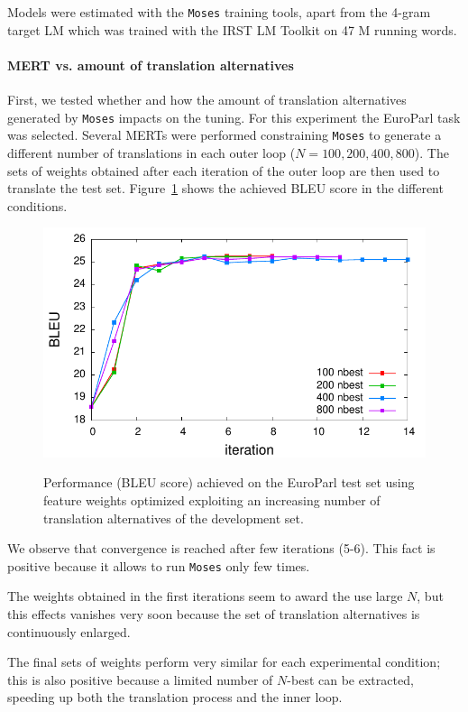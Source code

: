\documentclass[11pt]{report}
\theoremstyle{plain}
\begin{document}
{Models were estimated with the {\tt Moses} training tools, apart from the 4-gram target LM which was trained with the IRST LM Toolkit on 47 M running words.


\paragraph{MERT vs. amount of translation alternatives}
First, we tested whether and how the amount of translation alternatives generated by {\tt Moses} impacts on the tuning. For this experiment the EuroParl task was selected. Several MERTs were performed constraining {\tt Moses} to generate a different number of translations in each outer loop ($N=100, 200, 400, 800$). The sets of weights obtained after each iteration of the outer loop are then used to translate the test set. Figure~\ref{fig:MERT-epps-nbest} shows the achieved BLEU score in the different conditions.

\begin{figure}[ht]
\begin{center}
\label{fig:MERT-epps-nbest}
 \includegraphics[width=0.75\columnwidth]{MERT-nbest}
\caption{Performance (BLEU score) achieved on the EuroParl test set using feature weights optimized exploiting an increasing number of translation alternatives of the development set.}
\end{center}
 \end{figure}

We observe that convergence is reached after few iterations (5-6). This fact is positive because it allows to run {\tt Moses} only few times.

The weights obtained in the first iterations seem to award the use large $N$, but this effects vanishes very soon because the set of translation alternatives is continuously enlarged.

The final sets of weights perform very similar for each experimental condition; this is also positive because a limited number of $N$-best can be extracted, speeding up both the translation process and the inner loop.


}
\end{document}

